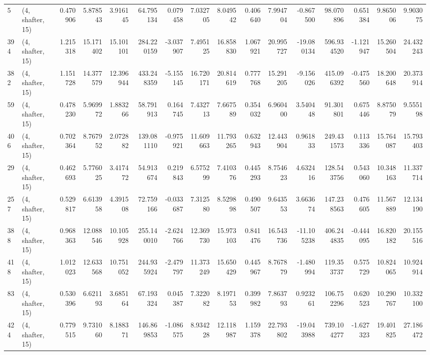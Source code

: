 \begin{tabular}{llrrrrrrrrrrrrrr}
5   &  (4, shafter, 15) &   0.470906 &   5.878543 &   3.916145 &    64.795134 &   0.079458 &   7.032705 &   8.049542 &  0.406640 &   7.994704 &  -0.867500 &    98.070896 &   0.651384 &   9.865006 &   9.903075 \\
394 &  (4, shafter, 15) &   1.215318 &  15.171402 &  15.101101 &   284.220159 &  -3.037907 &   7.495125 &  16.858830 &  1.067921 &  20.995727 & -19.080134 &   596.934520 &  -1.121947 &  15.260504 &  24.432243 \\
382 &  (4, shafter, 15) &   1.151728 &  14.377579 &  12.396944 &   433.248359 &  -5.155145 &  16.720171 &  20.814619 &  0.777768 &  15.291205 &  -9.156026 &   415.096392 &  -0.475560 &  18.200648 &  20.373914 \\
59  &  (4, shafter, 15) &   0.478230 &   5.969972 &   1.883266 &    58.791913 &   0.164745 &   7.432713 &   7.667589 &  0.354032 &   6.960400 &   3.540448 &    91.301801 &   0.675446 &   8.875079 &   9.555198 \\
406 &  (4, shafter, 15) &   0.702364 &   8.767952 &   2.072882 &   139.081110 &  -0.975921 &  11.609663 &  11.793265 &  0.632943 &  12.443904 &   0.961833 &   249.431573 &   0.113336 &  15.764087 &  15.793403 \\
29  &  (4, shafter, 15) &   0.462693 &   5.776025 &   3.417472 &    54.913674 &   0.219843 &   6.575299 &   7.410376 &  0.445293 &   8.754623 &   4.632416 &   128.543756 &   0.543060 &  10.348163 &  11.337714 \\
257 &  (4, shafter, 15) &   0.529817 &   6.613958 &   4.391508 &    72.759166 &  -0.033687 &   7.312580 &   8.529898 &  0.490507 &   9.643553 &   3.663674 &   147.238563 &   0.476605 &  11.567889 &  12.134190 \\
388 &  (4, shafter, 15) &   0.968363 &  12.088546 &  10.105928 &   255.140010 &  -2.624766 &  12.369730 &  15.973103 &  0.841476 &  16.543736 & -11.105238 &   406.244835 &  -0.444095 &  16.820182 &  20.155516 \\
418 &  (4, shafter, 15) &   1.012023 &  12.633568 &  10.751052 &   244.935924 &  -2.479797 &  11.373249 &  15.650429 &  0.445967 &   8.767879 &  -1.480994 &   119.353737 &   0.575729 &  10.824065 &  10.924914 \\
83  &  (4, shafter, 15) &   0.530396 &   6.621193 &   3.685164 &    67.193324 &   0.045387 &   7.322082 &   8.197153 &  0.399982 &   7.863793 &   0.923261 &   106.752296 &   0.620523 &  10.290767 &  10.332100 \\
424 &  (4, shafter, 15) &   0.779515 &   9.731060 &   8.188371 &   146.869853 &  -1.086575 &   8.934228 &  12.118987 &  1.159378 &  22.793802 & -19.043988 &   739.104277 &  -1.627323 &  19.401825 &  27.186472 \\

\end{tabular}
